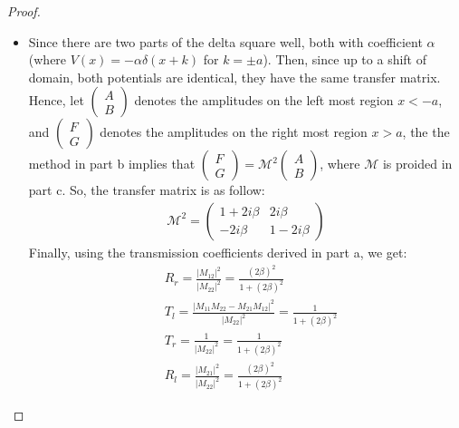 \documentclass{article}
\begin{document}
\begin{proof}
\begin{itemize}
    \item[d.] Since there are two parts of the delta square well, both with coefficient $\alpha$ (where $V(x)=-\alpha\delta(x+k)$ for $k=\pm a$). Then, since up to a shift of domain, both potentials are identical, they have the same transfer matrix. Hence, let $\begin{pmatrix}
        A\\B
    \end{pmatrix}$ denotes the amplitudes on the left most region $x<-a$, and $\begin{pmatrix}
        F\\G
    \end{pmatrix}$ denotes the amplitudes on the right most region $x>a$, the the method in part b implies that $\begin{pmatrix}
        F\\G
    \end{pmatrix}=\mathcal{M}^2\begin{pmatrix}
        A\\B
    \end{pmatrix}$, where $\mathcal{M}$ is proided in part c. So, the transfer matrix is as follow:
    \begin{align}
        \mathcal{M}^2 = \begin{pmatrix}
            1+2i\beta & 2i\beta\\-2i\beta & 1-2i\beta
        \end{pmatrix}
    \end{align}
        Finally, using the transmission coefficients derived in part a, we get:
        \begin{align}
            &R_r = \frac{|M_{12}|^2}{|M_{22}|^2} = \frac{(2\beta)^2}{1+(2\beta)^2}\\
            &T_l=\frac{|M_{11}M_{22}-M_{21}M_{12}|^2}{|M_{22}|^2} = \frac{1}{1+(2\beta)^2}\\
            &T_r=\frac{1}{|M_{22}|^2}=\frac{1}{1+(2\beta)^2}\\
            &R_l=\frac{|M_{21}|^2}{|M_{22}|^2}=\frac{(2\beta)^2}{1+(2\beta)^2}
        \end{align}
    \end{itemize}

\end{proof}

\newpage
\end{document}
